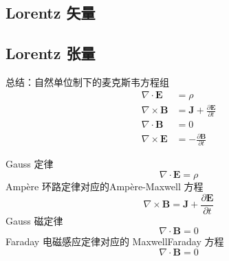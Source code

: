 \subsection{}














\subsection{ Lorentz 矢量}







\subsection{Lorentz 张量}





















总结：自然单位制下的麦克斯韦方程组
\begin{equation}
    \begin{aligned}
        \nabla \cdot \mathbf{E}&=\rho 
\\
\nabla \times \mathbf{B}&=\mathbf{J}+\frac{\partial \mathbf{E}}{\partial t}
\\
\nabla \cdot \mathbf{B}&=0
\\
\nabla \times \mathbf{E}&=-\frac{\partial \mathbf{B}}{\partial t}
    \end{aligned}
\end{equation}

Gauss 定律
\begin{equation}
    \nabla \cdot \mathbf{E}=\rho 
\end{equation}
Ampère 环路定律对应的Ampère-Maxwell 方程
\begin{equation}
    \nabla \times \mathbf{B}=\mathbf{J}+\frac{\partial \mathbf{E}}{\partial t}
\end{equation}
Gauss 磁定律
\begin{equation}
    \nabla \cdot \mathbf{B}=0
\end{equation}
Faraday 电磁感应定律对应的 MaxwellFaraday 方程
\begin{equation}
    \nabla \cdot \mathbf{B}=0
\end{equation}

